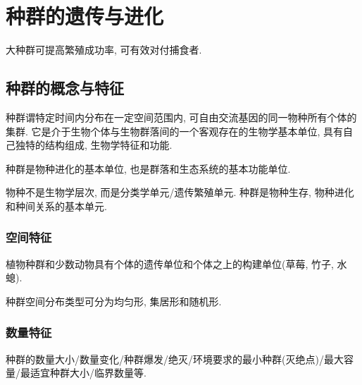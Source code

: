 \documentclass{ctexart}
\begin{document}
\section{种群的遗传与进化} %
\label{sec:种群的遗传与进化}

大种群可提高繁殖成功率, 可有效对付捕食者.

\subsection{种群的概念与特征} %
\label{sub:种群的概念与特征}

种群谓特定时间内分布在一定空间范围内, 可自由交流基因的同一物种所有个体的集群. 它是介于生物个体与生物群落间的一个客观存在的生物学基本单位, 具有自己独特的结构组成, 生物学特征和功能.
\par
种群是物种进化的基本单位, 也是群落和生态系统的基本功能单位.
\begin{pitfall}
    物种不是生物学层次, 而是分类学单元/遗传繁殖单元. 种群是物种生存, 物种进化和种间关系的基本单元.
\end{pitfall}

\subsubsection{空间特征} %
\label{ssub:空间特征}

植物种群和少数动物具有个体的遗传单位和个体之上的构建单位(草莓, 竹子, 水螅).
\par
种群空间分布类型可分为均匀形, 集居形和随机形.


\subsubsection{数量特征} %
\label{ssub:数量特征}

种群的数量大小/数量变化/种群爆发/绝灭/环境要求的最小种群(灭绝点)/最大容量/最适宜种群大小/临界数量等.

\end{document}
